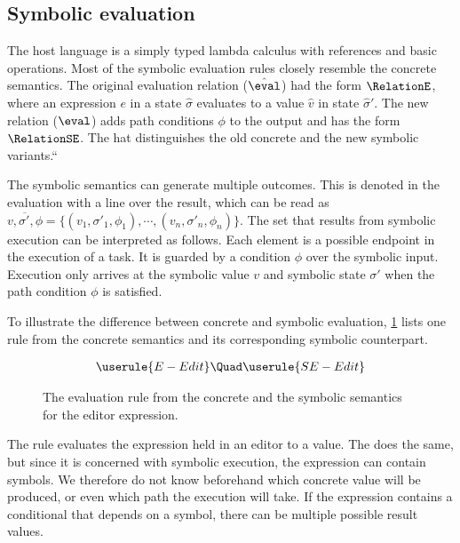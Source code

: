 \subsection{Symbolic evaluation}

The host language is a simply typed lambda calculus with references and basic operations.
Most of the symbolic evaluation rules closely resemble the concrete semantics.
The original evaluation relation ($\hat{\eval}$) had the form $\RelationE$,
where an expression $e$ in a state $\hat{\sigma}$ evaluates to a value $\hat{v}$ in state $\hat{\sigma}'$.
The new relation ($\eval$) adds path conditions $\phi$ to the output and has the form $\RelationSE$.
The hat distinguishes the old concrete and the new symbolic variants.``

The symbolic semantics can generate multiple outcomes.
This is denoted in the evaluation with a line over the result, which can be read as $\overline{v,\sigma',\phi} = \{(v_1,\sigma'_1,\phi_1),\cdots,(v_n,\sigma'_n,\phi_n)\}$.
The set that results from symbolic execution can be interpreted as follows.
Each element is a possible endpoint in the execution of a task.
It is guarded by a condition $\phi$ over the symbolic input.
Execution only arrives at the symbolic value $v$ and symbolic state $\sigma'$ when the path condition $\phi$ is satisfied.

To illustrate the difference between concrete and symbolic evaluation, \cref{fig:oldToNewSemantics} lists one rule from the concrete semantics and its corresponding symbolic counterpart.

\begin{figure}[ht]
  \small
  \begin{gather*}
    \userule{E-Edit}\Quad
    \userule{SE-Edit}
  \end{gather*}
  \caption{The evaluation rule from the concrete and the symbolic semantics for the editor expression.}
  \label{fig:oldToNewSemantics}
\end{figure}

The  rule evaluates the expression held in an editor to a value.
The  does the same, but since it is concerned with symbolic execution, the expression can contain symbols.
We therefore do not know beforehand which concrete value will be produced, or even which path the execution will take.
If the expression contains a conditional that depends on a symbol, there can be multiple possible result values.


